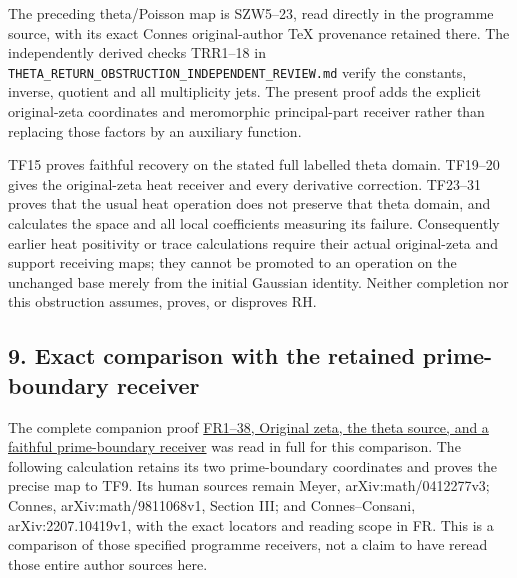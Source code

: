 \documentclass[
  10pt,
  a4paper,
]{article}
\begin{document}
The preceding theta/Poisson map is SZW5--23, read directly in the
programme source, with its exact Connes original-author TeX provenance
retained there. The independently derived checks TRR1--18 in
\texttt{THETA\_\allowbreak{}RETURN\_\allowbreak{}OBSTRUCTION\_\allowbreak{}INDEPENDENT\_\allowbreak{}REVIEW.\allowbreak{}md} verify the
constants, inverse, quotient and all multiplicity jets. The present
proof adds the explicit original-zeta coordinates and meromorphic
principal-part receiver rather than replacing those factors by an
auxiliary function.

TF15 proves faithful recovery on the stated full labelled theta domain.
TF19--20 gives the original-zeta heat receiver and every derivative
correction. TF23--31 proves that the usual heat operation does not
preserve that theta domain, and calculates the space and all local
coefficients measuring its failure. Consequently earlier heat positivity
or trace calculations require their actual original-zeta and support
receiving maps; they cannot be promoted to an operation on the unchanged
base merely from the initial Gaussian identity. Neither completion nor
this obstruction assumes, proves, or disproves RH.

\subsection{9. Exact comparison with the retained prime-boundary
receiver}\label{exact-comparison-with-the-retained-prime-boundary-receiver}

The complete companion proof
\href{https://github.com/KokunoYumeto/zeta-function-research-reader/blob/ec73ac350d0cda3d95c0bd1361bede33166b4d34/workbenches/splitzero-tandem/continuations/20260923-original-zeta-return/NOTE.tex}{FR1--38,
Original zeta, the theta source, and a faithful prime-boundary receiver}
was read in full for this comparison. The following calculation retains
its two prime-boundary coordinates and proves the precise map to TF9.
Its human sources remain Meyer, arXiv:math/0412277v3; Connes,
arXiv:math/9811068v1, Section III; and Connes--Consani,
arXiv:2207.10419v1, with the exact locators and reading scope in FR.
This is a comparison of those specified programme receivers, not a claim
to have reread those entire author sources here.
\end{document}
